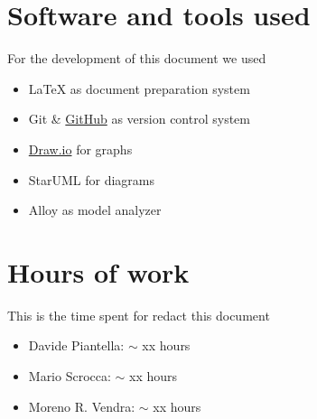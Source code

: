 \begin{appendices}
	\section{Software and tools used}
	For the development of this document we used
	\begin{itemize}
		\item \LaTeX{} as document preparation system
		\item Git \& \href{http://github.com}{GitHub} as version control system
		\item \href{http://draw.io}{Draw.io} for graphs
		\item StarUML for diagrams
		\item Alloy as model analyzer
	\end{itemize}
	
	\section{Hours of work}
	This is the time spent for redact this document
	\begin{itemize}
		\item Davide Piantella: $\sim$ xx hours
		\item Mario Scrocca: $\sim$ xx hours
		\item Moreno R. Vendra: $\sim$ xx hours
	\end{itemize}
\end{appendices}